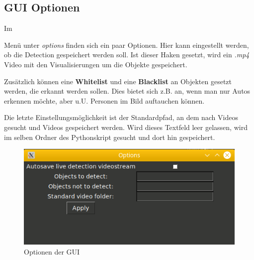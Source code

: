 \documentclass[12pt]{article}
\theoremstyle{definition}
\begin{document}
\subsection{GUI Optionen}
\begin{flushleft}
\hypertarget{opt_gui}{Im} Menü unter \textit{options} finden sich ein paar Optionen. Hier kann eingestellt werden, ob die Detection gespeichert werden soll. Ist dieser Haken gesetzt, wird ein \textit{.mp4} Video mit den Visualisierungen um die Objekte gespeichert.

Zusätzlich können eine \textbf{Whitelist} und eine \textbf{Blacklist} an Objekten gesetzt werden, die erkannt werden sollen. Dies bietet sich z.B. an, wenn man nur Autos erkennen möchte, aber u.U. Personen im Bild auftauchen können.

Die letzte Einstellungsmöglichkeit ist der Standardpfad, an dem nach Videos gesucht und Videos gespeichert werden. Wird dieses Textfeld leer gelassen, wird im selben Ordner des Pythonskript gesucht und dort hin gespeichert.

\begin{figure}[h]
\centering
\includegraphics[scale=0.7]{gui_options}
\caption{Optionen der GUI}
\label{fig:gui_home}
\end{figure}
\end{flushleft}

\newpage


\begingroup
\raggedright
\sloppy
\printbibliography
\endgroup
\end{document}
